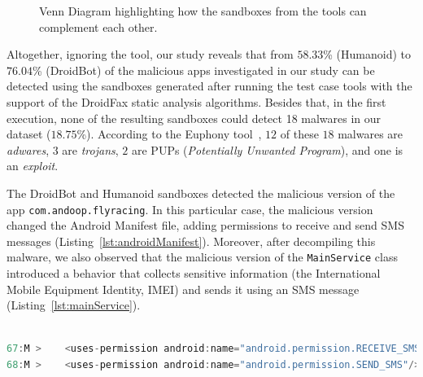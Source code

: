 \begin{figure}[htb]
  \caption{Venn Diagram highlighting how the sandboxes from the tools can
    complement each other.}
  \label{fig:venn-plot1}
\end{figure}


Altogether, ignoring the \joke tool, our study reveals that from $58.33$\% (Humanoid)
to $76.04$\% (DroidBot) of the malicious apps investigated in our study can be
detected using the sandboxes generated after running the test case tools with the support of the
DroidFax static analysis algorithms. Besides that, in the first execution, none of the
resulting sandboxes could detect 18 malwares in our dataset ($18.75$\%). According to
the Euphony tool~\cite{hurier2017euphony}, $12$ of these $18$ malwares are \emph{adwares}, $3$ are \emph{trojans}, $2$ are
PUPs (\emph{Potentially Unwanted Program}), and one is an \emph{exploit}.

The DroidBot and Humanoid sandboxes detected the malicious version of the app
\texttt{com.andoop.flyracing}. In this particular case,
the malicious version changed the Android Manifest file,
adding permissions to receive and send SMS messages
(Listing~\ref{lst:androidManifest}). Moreover, after decompiling
this malware, we also observed that the malicious version of the
\texttt{MainService} class introduced a
behavior that collects sensitive information (the International Mobile
Equipment Identity, IMEI) and sends it using an SMS message
(Listing~\ref{lst:mainService}). 

\begin{lstlisting}[caption={Diffs in the \texttt{com.gau.screenguru.finger}
      AndroidManifest file of the malicious
      version}, language=Java,
    basicstyle=\fontsize{8}{6}\selectfont\ttfamily,
    label={lst:androidManifest}]

67:M >    <uses-permission android:name="android.permission.RECEIVE_SMS"/>
68:M >    <uses-permission android:name="android.permission.SEND_SMS"/>
\end{lstlisting}

